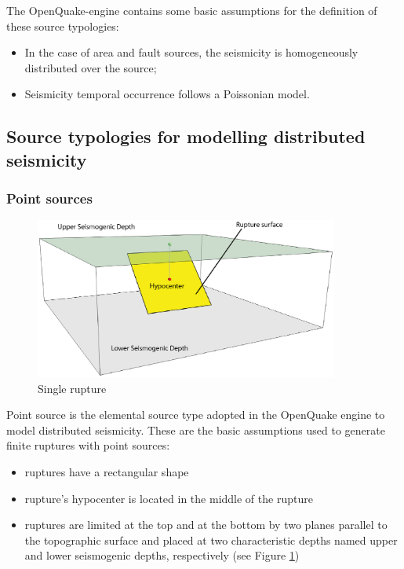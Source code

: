 The OpenQuake-engine contains some basic assumptions for the 
definition of these source typologies:
\begin{itemize}
	\item In the case of area and fault sources, the seismicity 
        is homogeneously distributed over the source; 	
	\item Seismicity temporal occurrence follows a Poissonian model. 
\end{itemize}
\subsection{Source typologies for modelling distributed seismicity}
\subsubsection{Point sources}
\label{hazard:seismic_source_types:pointSources}
\begin{figure}[!ht]
\centering
\includegraphics[width=10cm]{./figures/hazard/single_rupture.eps}
\caption{Single rupture}
\label{fig:single_rupture}
\end{figure}
Point source is the elemental source type adopted in the OpenQuake engine 
to model distributed seismicity. These are the basic assumptions used to 
generate finite ruptures with point sources:
\begin{itemize}
	\item ruptures have a rectangular shape
	\item rupture's hypocenter is located in the middle of the rupture
	\item ruptures are limited at the top and at the bottom by two planes 
	parallel to the topographic surface and placed at two characteristic 
	depths named upper and lower seismogenic depths, respectively (see 
	Figure \ref{fig:single_rupture})
\end{itemize} 
%
